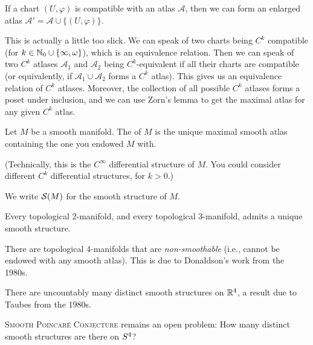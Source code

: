 \begin{node}
If a chart $(U,\varphi)$ is compatible with an atlas $\mathcal{A}$,
then we can form an enlarged atlas $\mathcal{A}'=\mathcal{A}\cup\{(U,\varphi)\}$.
\end{node}

\begin{remark}
This is actually a little too slick. We can speak of two charts being
$C^{k}$ compatible (for $k\in\mathbb{N}_{0}\cup\{\infty,\omega\}$), which is
an equivalence relation. Then we can speak of two $C^{k}$ atlases
$\mathcal{A}_{1}$ and $\mathcal{A}_{2}$ being $C^{k}$-equivalent if all their
charts are compatible (or equivalently, if
$\mathcal{A}_{1}\cup\mathcal{A}_{2}$ forms a $C^{k}$ atlas). This
gives us an equivalence relation of $C^{k}$ atlases. Moreover, the
collection of all possible $C^{k}$ atlases forms a poset under
inclusion, and we can use Zorn's lemma to get the maximal atlas for
any given $C^{k}$ atlas.
\end{remark}

\begin{definition}
Let $M$ be a smooth manifold. The  of $M$ is
the unique maximal smooth atlas containing the one you endowed $M$
with.

(Technically, this is the $C^{\infty}$ differential structure of
$M$. You could consider different $C^{k}$ differential structures, for $k>0$.)
\end{definition}

\begin{notation}
We write $\mathcal{S}(M)$ for the smooth structure of $M$.
\end{notation}

\begin{remark}
Every topological 2-manifold, and every topological 3-manifold, admits
a unique smooth structure.
\end{remark}

\begin{remark}
There are topological 4-manifolds that are \emph{non-smoothable}
(i.e., cannot be endowed with any smooth atlas). This is due to
Donaldson's work from the 1980s.
\end{remark}

\begin{remark}
There are uncountably many distinct smooth structures on $\mathbb{R}^{4}$, a
result due to Taubes from the 1980s.
\end{remark}

\begin{remark}
\textsc{Smooth Poincar\'{e} Conjecture} remains an open problem: How
many distinct smooth structures are there on $S^{4}$?
\end{remark}

